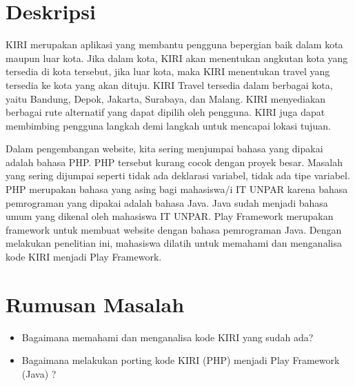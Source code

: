 \documentclass[a4paper,twoside]{article}
\begin{document}
\title{\@judultopik}
\author{\nama \textendash \@npm} 

\newcommand{\nama}{Steven Sutana}
\newcommand{\@npm}{2012730046}
\newcommand{\@judultopik}{Porting PHP menjadi Play Framework (KIRI \textit{Front-End})} %
\newcommand{\jumpemb}{1} %
\newcommand{\tanggal}{26/08/2015}
\maketitle


\section{Deskripsi}
KIRI merupakan aplikasi yang membantu pengguna bepergian baik dalam kota maupun luar kota. Jika dalam kota, KIRI akan menentukan angkutan kota yang tersedia di kota tersebut, jika luar kota, maka KIRI menentukan travel yang tersedia ke kota yang akan dituju. KIRI Travel tersedia dalam berbagai kota, yaitu Bandung, Depok, Jakarta, Surabaya, dan Malang. KIRI menyediakan berbagai rute alternatif yang dapat dipilih oleh pengguna. KIRI juga dapat membimbing pengguna langkah demi langkah untuk mencapai lokasi tujuan. 

Dalam pengembangan website, kita sering menjumpai bahasa yang dipakai adalah bahasa PHP. PHP tersebut kurang cocok dengan proyek besar. Masalah yang sering dijumpai seperti tidak ada deklarasi variabel, tidak ada tipe variabel. PHP merupakan bahasa yang asing bagi mahasiswa/i IT UNPAR karena bahasa pemrograman yang dipakai adalah bahasa Java. Java sudah menjadi bahasa umum yang dikenal oleh mahasiswa IT UNPAR. Play Framework merupakan framework untuk membuat website dengan bahasa pemrograman Java. Dengan melakukan penelitian ini, mahasiswa dilatih untuk memahami dan menganalisa kode KIRI menjadi Play Framework.

\section{Rumusan Masalah}
\begin{itemize}
	\item Bagaimana memahami dan menganalisa kode KIRI yang sudah ada?
	\item Bagaimana melakukan porting kode KIRI (PHP) menjadi Play Framework (Java) ?
\end{itemize}
\end{document}
